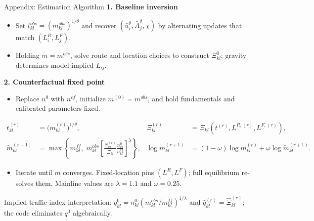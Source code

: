 \documentclass[11pt,aspectratio=169]{beamer}
\newcommand{\navbackfwd}[2]{\par\vspace{0.35em}\noindent\hfill\hyperlink{#1}{\beamerreturnbutton{back}}\;\hyperlink{#2}{\beamergotobutton{details}}}
\begin{document}
\begin{frame}[label=appfund]{Appendix: Estimation Algorithm}
\small\textbf{1. Baseline inversion}\par
\vspace{0.08em}
\begin{itemize}\footnotesize\setlength\itemsep{0.22em}
  \item Set $t_{kl}^{obs}=(m_{kl}^{obs})^{1/\theta}$ and recover $(\bar u_i^\theta,\bar A_j^\theta,\chi)$ by alternating updates that match $(L_i^R,L_j^F)$.
  \item Holding $m=m^{obs}$, solve route and location choices to construct $\Xi_{kl}^{0}$; gravity determines model-implied $L_{ij}$.
\end{itemize}
\vspace{0.10em}
\small\textbf{2. Counterfactual fixed point}\par
\vspace{0.04em}
\begin{itemize}\footnotesize\setlength\itemsep{0.18em}
  \item Replace $n^0$ with $n^{cf}$, initialize $m^{(0)}=m^{obs}$, and hold fundamentals and calibrated parameters fixed.
\end{itemize}
\vspace{-0.62em}
{\footnotesize\begin{align*}
  t_{kl}^{(r)}&=\big(m_{kl}^{(r)}\big)^{1/\theta},
  &\Xi_{kl}^{(r)}&=\Xi_{kl}\!\left(t^{(r)},L^{R,(r)},L^{F,(r)}\right),\\[-0.15em]
  \widetilde m_{kl}^{(r+1)}
  &=\max\!\left\{m_{kl}^{ff},\;
  m_{kl}^{obs}\left[
  \frac{\Xi_{kl}^{(r)}}{\Xi_{kl}^{0}}
  \frac{n_{kl}^{0}}{n_{kl}^{cf}}
  \right]^{\lambda}\right\},
  &\log m_{kl}^{(r+1)}
  &=(1-\omega)\log m_{kl}^{(r)}+\omega\log\widetilde m_{kl}^{(r+1)}.
\end{align*}}
\vspace{-0.65em}
\begin{itemize}\footnotesize\setlength\itemsep{0.18em}
  \item Iterate until $m$ converges. Fixed-location pins $(L^R,L^F)$; full equilibrium re-solves them. Mainline values are $\lambda=1.1$ and $\omega=0.25$.
\end{itemize}
\vspace{-0.03em}
{\scriptsize\color{gray!80} Implied traffic-index interpretation: $q_{kl}^{0}=n_{kl}^{0}(m_{kl}^{obs}/m_{kl}^{ff})^{1/\lambda}$ and $\widehat q_{kl}^{(r)}=\widehat\Xi_{kl}^{(r)}$; the code eliminates $q^0$ algebraically.}
\navbackfwd{estsolve}{appodfit}
\end{frame}
\end{document}
